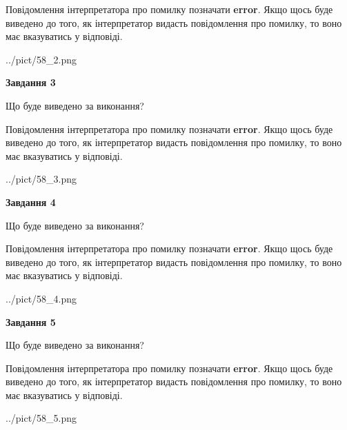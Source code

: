 \documentclass[12pt, ukrainian]{article}
\begin{document}
{\begin {large}
Повідомлення інтерпретатора про помилку позначати \textbf{error}.
Якщо щось буде виведено до того, як інтерпретатор видасть повідомлення про помилку, 
то воно має вказуватись у відповіді. \par


\begin{center}
	{../pict/58_2.png}
\end{center}
\newpage

{\begin {center}\textbf{Завдання 3}\end {center}}\par
Що буде виведено за виконання?

Повідомлення інтерпретатора про помилку позначати \textbf{error}.
Якщо щось буде виведено до того, як інтерпретатор видасть повідомлення про помилку, 
то воно має вказуватись у відповіді. \par


\begin{center}
	{../pict/58_3.png}
\end{center}
\newpage

{\begin {center}\textbf{Завдання 4}\end {center}}\par
Що буде виведено за виконання?

Повідомлення інтерпретатора про помилку позначати \textbf{error}.
Якщо щось буде виведено до того, як інтерпретатор видасть повідомлення про помилку, 
то воно має вказуватись у відповіді. \par


\begin{center}
	{../pict/58_4.png}
\end{center}
\newpage

{\begin {center}\textbf{Завдання 5}\end {center}}\par
Що буде виведено за виконання?

Повідомлення інтерпретатора про помилку позначати \textbf{error}.
Якщо щось буде виведено до того, як інтерпретатор видасть повідомлення про помилку, 
то воно має вказуватись у відповіді. \par


\begin{center}
	{../pict/58_5.png}
\end{center}
\newpage


\end{large}}
\end{document}
